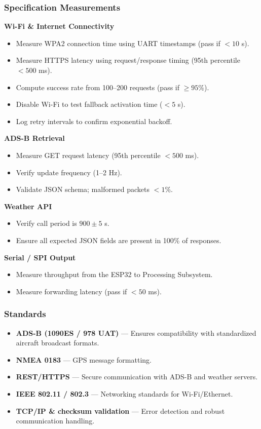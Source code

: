 \subsubsection{Specification Measurements}
\textbf{Wi-Fi \& Internet Connectivity}
\begin{itemize}
    \item Measure WPA2 connection time using UART timestamps (pass if $<10$ s).
    \item Measure HTTPS latency using request/response timing (95th percentile $<500$ ms).
    \item Compute success rate from 100–200 requests (pass if $\ge 95\%$).
    \item Disable Wi-Fi to test fallback activation time ($<5$ s).
    \item Log retry intervals to confirm exponential backoff.
\end{itemize}

\textbf{ADS-B Retrieval}
\begin{itemize}
    \item Measure GET request latency (95th percentile $<500$ ms).
    \item Verify update frequency (1–2 Hz).
    \item Validate JSON schema; malformed packets $<1\%$.
\end{itemize}

\textbf{Weather API}
\begin{itemize}
    \item Verify call period is $900 \pm 5$ s.
    \item Ensure all expected JSON fields are present in 100\% of responses.
\end{itemize}

\textbf{Serial / SPI Output}
\begin{itemize}
    \item Measure throughput from the ESP32 to Processing Subsystem.
    \item Measure forwarding latency (pass if $<50$ ms).
\end{itemize}

\subsubsection{Standards}
\begin{itemize}
    \item \textbf{ADS-B (1090ES / 978 UAT)} — Ensures compatibility with standardized aircraft broadcast formats.
    \item \textbf{NMEA 0183} — GPS message formatting.
    \item \textbf{REST/HTTPS} — Secure communication with ADS-B and weather servers.
    \item \textbf{IEEE 802.11 / 802.3} — Networking standards for Wi-Fi/Ethernet.
    \item \textbf{TCP/IP \& checksum validation} — Error detection and robust communication handling.
\end{itemize}

